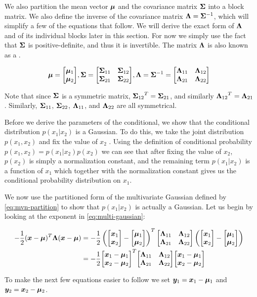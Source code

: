 We also partition the mean vector $\vmu$ and the covariance matrix $\mSigma$ into a block matrix. We also define the inverse of the covariance matrix $\mLambda = \mSigma^{-1}$, which will simplify a few of the equations that follow. We will derive the exact form of $\mLambda$ and of its individual blocks later in this section. For now we simply use the fact that $\mSigma$ is positive-definite, and thus it is invertible. The matrix $\mLambda$ is also known as a .

\begin{equation}
\vmu = \partmu,
\mSigma = \partsigma, \mLambda = \mSigma^{-1} = \partlambda \label{eq:mvn-partition}
\end{equation}

Note that since $\mSigma$ is a symmetric matrix, $\ms{12}^T = \ms{21}$, and similarly $\ml{12}^T = \ml{21}$. Similarly, $\ms{11}$, $\ms{22}$, $\ml{11}$, and $\ml{22}$ are all symmetrical.

Before we derive the parameters of the conditional, we show that the conditional distribution $p(x_1 | x_2)$ is a Gaussian. To do this, we take the joint distribution $p(x_1, x_2)$ and fix the value of $x_2$ \citep{bishop2016pattern}. Using the definition of conditional probability $p(x_1, x_2) = p(x_1 | x_2) p(x_2)$ we can see that after fixing the value of $x_2$, $p(x_2)$ is simply a normalization constant, and the remaining term $p(x_1 | x_2)$ is a function of $x_1$ which together with the normalization constant gives us the conditional probability distribution on $x_1$.

We now use the partitioned form of the multivariate Gaussian defined by \eqref{eq:mvn-partition} to show that $p(x_1 | x_2)$ is actually a Gaussian. Let us begin by looking at the exponent in \eqref{eq:multi-gaussian}:

\begin{align}
-\frac{1}{2} (\vx - \vmu)^T \mLambda (\vx - \vmu) &= 
-\frac{1}{2} \left(\partx - \partmu \right)^T \partlambda \left(\partx - \partmu \right) \\
&= -\frac{1}{2} \partxmu^T \partlambda \partxmu
\end{align}

To make the next few equations easier to follow we set $\vy_1 = \vx_1 - \vmu_1$ and $\vy_2 = \vx_2 - \vmu_2$.

